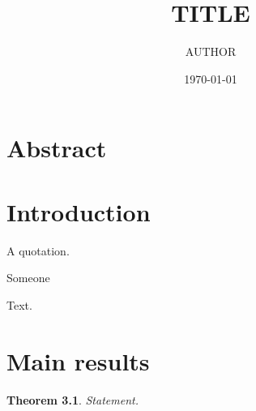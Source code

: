 \documentclass[12pt,oneside]{memoir}
\title{{{TITLE}}}
\author{{{AUTHOR}}}
\date{\today}
\theoremstyle{plain}
\newtheorem{theorem}{Theorem}[chapter]
\theoremstyle{definition}
\theoremstyle{remark}
\begin{document}
\frontmatter
\maketitle
\chapter{Abstract}
\tableofcontents*
\mainmatter
\chapter{Introduction}
\epigraph{A quotation.}{Someone}
Text.
\chapter{Main results}
\begin{theorem}
Statement.
\end{theorem}
\backmatter


\end{document}
